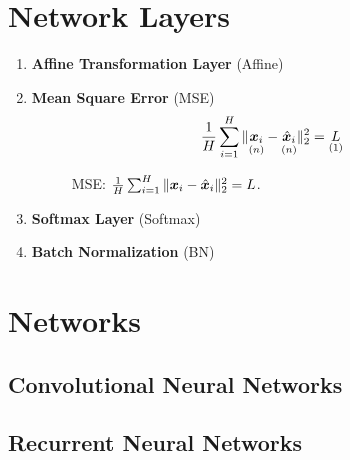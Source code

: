 \documentclass[9pt,twocolumn,times]{article}
\begin{document}
\section{Network Layers}

\begin{enumerate}[leftmargin=*]
\item \textbf{Affine Transformation Layer} (Affine)

\item \textbf{Mean Square Error} (MSE)
\begin{equation}
	\frac{1}{H} \sum_{i=1}^H
	\|\underset{(n)}{{\bm{x}}_i} - \underset{(n)}{\hat{{\bm{x}}}_i} \|_2^2
	= \underset{(1)}{L} 
\end{equation}
\begin{figure}[h]
	\centering
	\resizebox{0.618\columnwidth}{!}{%
		
	}
	\caption{MSE: $\frac{1}{H} \sum_{i=1}^H \|{\bm{x}}_i - \hat{{\bm{x}}}_i\|_2^2 = L$.}
\end{figure}

\item \textbf{Softmax Layer} (Softmax)

\item \textbf{Batch Normalization} (BN)
\end{enumerate}

\section{Networks}

\subsection{Convolutional Neural Networks}

\subsection{Recurrent Neural Networks}
\end{document}
